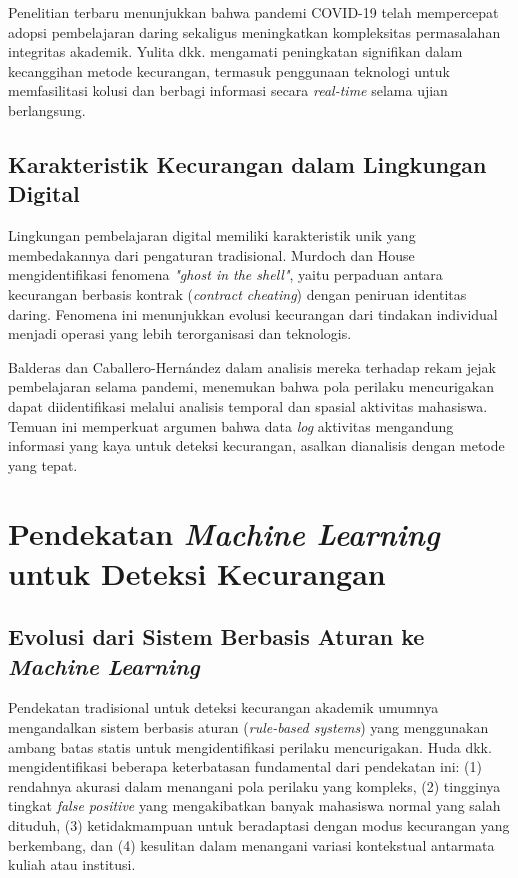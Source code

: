 Penelitian terbaru menunjukkan bahwa pandemi COVID-19 telah mempercepat adopsi pembelajaran daring sekaligus meningkatkan kompleksitas permasalahan integritas akademik. Yulita dkk. \cite{Yulita2023} mengamati peningkatan signifikan dalam kecanggihan metode kecurangan, termasuk penggunaan teknologi untuk memfasilitasi kolusi dan berbagi informasi secara \textit{real-time} selama ujian berlangsung.

\subsection{Karakteristik Kecurangan dalam Lingkungan Digital}

Lingkungan pembelajaran digital memiliki karakteristik unik yang membedakannya dari pengaturan tradisional. Murdoch dan House \cite{Murdoch2019} mengidentifikasi fenomena \textit{"ghost in the shell"}, yaitu perpaduan antara kecurangan berbasis kontrak (\textit{contract cheating}) dengan peniruan identitas daring. Fenomena ini menunjukkan evolusi kecurangan dari tindakan individual menjadi operasi yang lebih terorganisasi dan teknologis.

Balderas dan Caballero-Hern\'{a}ndez \cite{Balderas2020} dalam analisis mereka terhadap rekam jejak pembelajaran selama pandemi, menemukan bahwa pola perilaku mencurigakan dapat diidentifikasi melalui analisis temporal dan spasial aktivitas mahasiswa. Temuan ini memperkuat argumen bahwa data \textit{log} aktivitas mengandung informasi yang kaya untuk deteksi kecurangan, asalkan dianalisis dengan metode yang tepat.

\section{Pendekatan \textit{Machine Learning} untuk Deteksi Kecurangan}
\label{sec:mlApproaches}

\subsection{Evolusi dari Sistem Berbasis Aturan ke \textit{Machine Learning}}

Pendekatan tradisional untuk deteksi kecurangan akademik umumnya mengandalkan sistem berbasis aturan (\textit{rule-based systems}) yang menggunakan ambang batas statis untuk mengidentifikasi perilaku mencurigakan. Huda dkk. \cite{article:rule_based_limitations} mengidentifikasi beberapa keterbatasan fundamental dari pendekatan ini: (1) rendahnya akurasi dalam menangani pola perilaku yang kompleks, (2) tingginya tingkat \textit{false positive} yang mengakibatkan banyak mahasiswa normal yang salah dituduh, (3) ketidakmampuan untuk beradaptasi dengan modus kecurangan yang berkembang, dan (4) kesulitan dalam menangani variasi kontekstual antarmata kuliah atau institusi.

